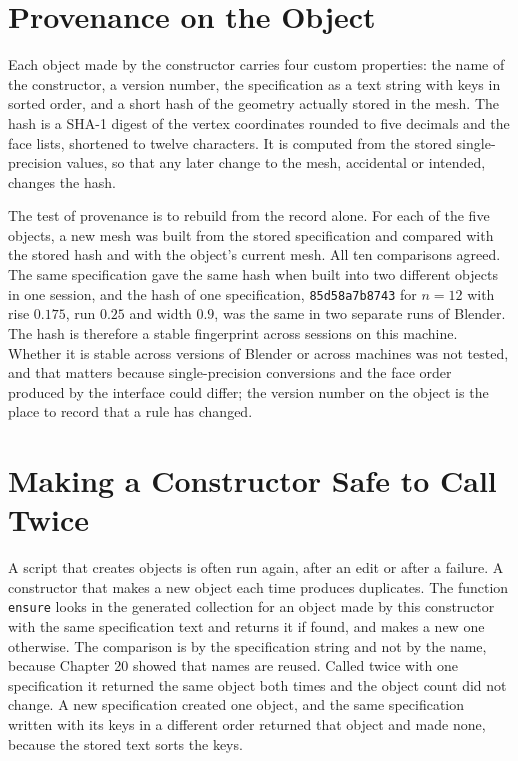 \section{Provenance on the Object}

Each object made by the constructor carries four custom properties: the name of the constructor, a version number, the specification as a text string with keys in sorted order, and a short hash of the geometry actually stored in the mesh. The hash is a SHA-1 digest of the vertex coordinates rounded to five decimals and the face lists, shortened to twelve characters. It is computed from the stored single-precision values, so that any later change to the mesh, accidental or intended, changes the hash.

The test of provenance is to rebuild from the record alone. For each of the five objects, a new mesh was built from the stored specification and compared with the stored hash and with the object's current mesh. All ten comparisons agreed. The same specification gave the same hash when built into two different objects in one session, and the hash of one specification, \texttt{85d58a7b8743} for $n=12$ with rise $0.175$, run $0.25$ and width $0.9$, was the same in two separate runs of Blender. The hash is therefore a stable fingerprint across sessions on this machine. Whether it is stable across versions of Blender or across machines was not tested, and that matters because single-precision conversions and the face order produced by the interface could differ; the version number on the object is the place to record that a rule has changed.

\section{Making a Constructor Safe to Call Twice}

A script that creates objects is often run again, after an edit or after a failure. A constructor that makes a new object each time produces duplicates. The function \texttt{ensure} looks in the generated collection for an object made by this constructor with the same specification text and returns it if found, and makes a new one otherwise. The comparison is by the specification string and not by the name, because Chapter 20 showed that names are reused. Called twice with one specification it returned the same object both times and the object count did not change. A new specification created one object, and the same specification written with its keys in a different order returned that object and made none, because the stored text sorts the keys.

